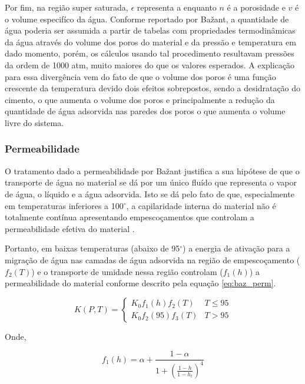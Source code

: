     Por fim, na região super saturada, $\epsilon$ representa a enquanto $n$ é a
    porosidade e $v$ é o volume especifíco da água. Conforme reportado por
    Ba\v{z}ant, a quantidade de água poderia ser assumida a partir de tabelas
    com propriedades termodinâmicas da água através do volume dos poros do
    material e da pressão e temperatura em dado momento, porém, os cálculos
    usando tal procedimento resultavam pressões da ordem de 1000 atm, muito
    maiores do que os valores esperados. A explicação para essa divergência vem
    do fato de que o volume dos poros é uma função crescente da temperatura
    devido dois efeitos sobrepostos, sendo a desidratação do cimento, o que
    aumenta o volume dos poros e principalmente a redução da quantidade de água
    adsorvida nas paredes dos poros o que aumenta o volume livre do sistema.

    \subsubsection{Permeabilidade}
    O tratamento dado a permeabilidade por Ba\v{z}ant justifica a sua hipótese
    de que o transporte de água no material se dá por um único fluído que
    representa o vapor de água, o líquido e a água adsorvida. Isto se dá pelo
    fato de que, especialmente em temperaturas inferiores a 100$^{\circ}$, a
    capilaridade interna do material não é totalmente contínua apresentando
    empescoçamentos que controlam a permeabilidade efetiva do material
    \cite{bazant1978}.

    Portanto, em baixas temperaturas (abaixo de 95$^{\circ}$) a energia de ativação para a migração de
    água nas camadas de água adsorvida na região de empescoçamento ($f_2(T)$) e o
    transporte de umidade nessa região controlam ($f_1(h)$) a permeabilidade do material
    conforme descrito pela equação \ref{eq:baz_perm}.
    
    \begin{equation}
      \label{eq:baz_perm}
      K(P, T) =
      \begin{cases} 
       K_0 f_1(h) f_2(T) & T \leq 95 \\
       K_0 f_2(95) f_3(T) & T > 95 
      \end{cases}
    \end{equation}

    Onde,

    \begin{equation}
      \label{eq:f1}
     f_1(h) = \alpha + \frac{1-\alpha}{1+\left(\frac{1-h}{1-h_t}\right)^4} 
    \end{equation}


